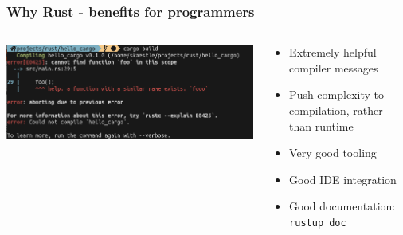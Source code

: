 \documentclass[aspectratio=169]{beamer}
\begin{document}
\begin{frame}
  \frametitle{Why Rust - benefits for programmers}

  \begin{columns}
    \begin{column}{.5\linewidth}
      \includegraphics[width=\linewidth]{figs/screenshots/presentation-20190612-105305}
    \end{column}

    \begin{column}{.5\linewidth}
      \begin{itemize}
      \item Extremely helpful compiler messages
      \item Push complexity to compilation, rather than runtime

      \item Very good tooling
      \item Good IDE integration
      \item Good documentation: \texttt{rustup doc}
      \end{itemize}
    \end{column}
  \end{columns}
\end{frame}
\end{document}
